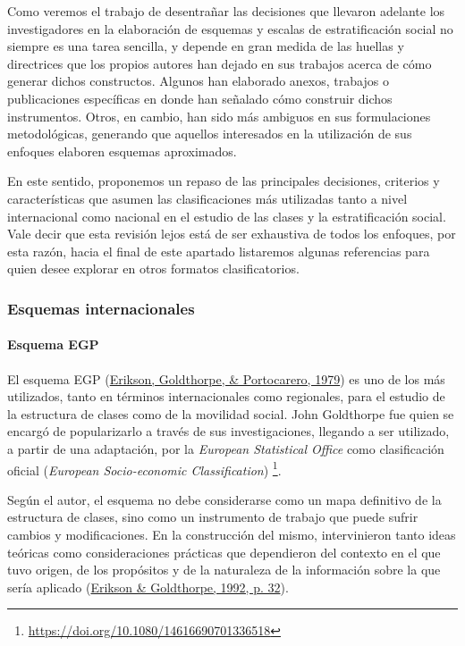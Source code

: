 \documentclass[
]{article}
\begin{document}
Como veremos el trabajo de desentrañar las decisiones que llevaron adelante los investigadores en la elaboración de esquemas y escalas de estratificación social no siempre es una tarea sencilla, y depende en gran medida de las huellas y directrices que los propios autores han dejado en sus trabajos acerca de cómo generar dichos constructos. Algunos han elaborado anexos, trabajos o publicaciones específicas en donde han señalado cómo construir dichos instrumentos. Otros, en cambio, han sido más ambiguos en sus formulaciones metodológicas, generando que aquellos interesados en la utilización de sus enfoques elaboren esquemas aproximados.

En este sentido, proponemos un repaso de las principales decisiones, criterios y características que asumen las clasificaciones más utilizadas tanto a nivel internacional como nacional en el estudio de las clases y la estratificación social. Vale decir que esta revisión lejos está de ser exhaustiva de todos los enfoques, por esta razón, hacia el final de este apartado listaremos algunas referencias para quien desee explorar en otros formatos clasificatorios.

\hypertarget{esquemas-internacionales}{%
\subsubsection{Esquemas internacionales}\label{esquemas-internacionales}}

\hypertarget{esquema-egp}{%
\paragraph{Esquema EGP}\label{esquema-egp}}

El esquema EGP (\protect\hyperlink{ref-Erikson.etal1979}{Erikson, Goldthorpe, \& Portocarero, 1979}) es uno de los más utilizados, tanto en términos internacionales como regionales, para el estudio de la estructura de clases como de la movilidad social. John Goldthorpe fue quien se encargó de popularizarlo a través de sus investigaciones, llegando a ser utilizado, a partir de una adaptación, por la \emph{European Statistical Office} como clasificación oficial (\emph{European Socio-economic Classification}) \footnote{\url{https://doi.org/10.1080/14616690701336518}}.

Según el autor, el esquema no debe considerarse como un mapa definitivo de la estructura de clases, sino como un instrumento de trabajo que puede sufrir cambios y modificaciones. En la construcción del mismo, intervinieron tanto ideas teóricas como consideraciones prácticas que dependieron del contexto en el que tuvo origen, de los propósitos y de la naturaleza de la información sobre la que sería aplicado (\protect\hyperlink{ref-Erikson1992}{Erikson \& Goldthorpe, 1992, p. 32}).
\end{document}

